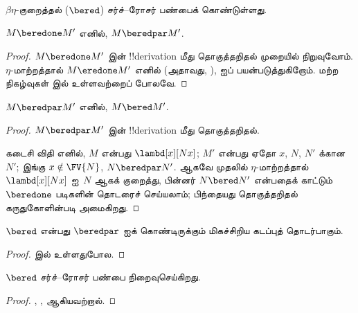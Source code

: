 \documentclass[../../../include/open-logic-section]{subfiles}
\begin{document}


$\beta\eta$-குறைத்தல் ($\bered$) சர்ச்--ரோசர் பண்பைக் கொண்டுள்ளது.

\begin{lem}
  $M \beredone M'$ எனில், $M \beredpar M'$.
\end{lem}

\begin{proof}
  $M \beredone M'$ இன் !!{derivation} மீது தொகுத்தறிதல் முறையில் நிறுவுவோம்.
  $\eta$-மாற்றத்தால் $M \eredone M'$ எனில் (அதாவது,
  ),  ஐப்
  பயன்படுத்துகிறோம். மற்ற நிகழ்வுகள்  இல்
  உள்ளவற்றைப் போலவே.
\end{proof}


\begin{lem}
  $M \beredpar M'$ எனில், $M \bered M'$.
\end{lem}

\begin{proof} $M \beredpar M'$ இன் !!{derivation} மீது தொகுத்தறிதல்.

  கடைசி விதி  எனில், $M$ என்பது
  $\lambd[x][Nx]$; $M'$ என்பது ஏதோ $x$, $N$, $N'$ க்கான $N'$; இங்கு
  $x \notin \FV{N}$, $N \beredpar N'$. ஆகவே முதலில் $\eta$-மாற்றத்தால்
  $\lambd[x][Nx]$ ஐ~$N$ ஆகக் குறைத்து, பின்னர் $N \bered N'$ என்பதைக்
  காட்டும் $\beredone$ படிகளின் தொடரைச் செய்யலாம்; பிந்தையது தொகுத்தறிதல்
  கருதுகோளின்படி அமைகிறது.
\end{proof}


\begin{lem}
  $\bered$ என்பது $\beredpar$ ஐக் கொண்டிருக்கும் மிகச்சிறிய கடப்புத் தொடர்பாகும்.
\end{lem}

\begin{proof}
   இல் உள்ளதுபோல.
\end{proof}

\begin{thm}
  $\bered$ சர்ச்--ரோசர் பண்பை நிறைவுசெய்கிறது.
\end{thm}

\begin{proof}
  , ,  ஆகியவற்றால்.
\end{proof}
\end{document}
